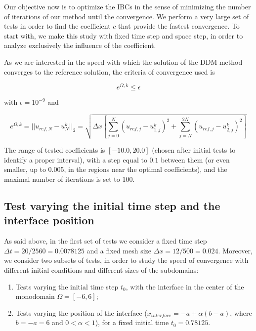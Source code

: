 \indent Our objective now is to optimize the IBCs in the sense of minimizing the number of iterations of our method until the convergence. We  perform a very large set of tests in order to find the coefficient $c$  that provide the fastest convergence. To start with, we make this study with fixed time step and space step, in order to analyze exclusively the influence of the coefficient.

\indent As we are interested in the speed with which the solution of the DDM method converges to the reference solution, the criteria of convergence used is

\begin{equation*}
	e^{\Omega,k} \leq \epsilon
\end{equation*}

\noindent with $\epsilon = 10^{-9}$ and 

\begin{equation*}
	e^{\Omega,k} = ||u_{ref,N} - u^{k}_N||_2 = \sqrt{\Delta x \left[ \sum_{j=0}^N{\left(u_{ref,j} - u^{k}_{1,j}\right)^2 } + \sum_{j=N}^{2N}{\left(u_{ref,j} - u^{k}_{2,j}\right)^2 } \right] }
\end{equation*}
 
\indent {}The range of tested coefficients is $[-10.0, 20.0]$ (chosen after initial tests to identify a proper interval), with a step equal to  $0.1$ between them (or even smaller, up to $0.005$, in the regions near the optimal coefficients), and the maximal number of iterations is set to 100.

\subsection{Test varying the initial time step and the interface position}

\indent As said above, in the first set of tests we consider a fixed time step $\Delta t = 20/2560 = 0.0078125$ and a fixed mesh size $\Delta x = 12/500 = 0.024$. Moreover, we consider two subsets of tests, in order to study the speed of convergence with different initial conditions and different sizes of the subdomains:

\begin{enumerate}
	\item Tests varying the initial time step $t_0$, with the interface in the center of the monodomain $\Omega = [-6,6]$;
	\item Tests varying the position of the interface ($x_{interface} = -a + \alpha (b-a)$, where $b = -a = 6$ and $0 < \alpha < 1$), for a fixed initial time $t_0 = 0.78125$.
\end{enumerate}

